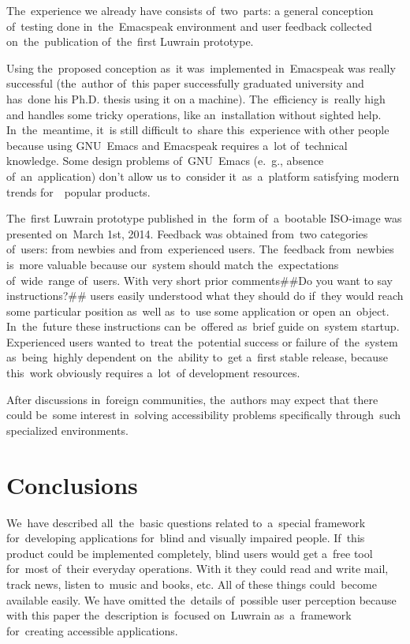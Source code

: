 \documentclass{acm_proc_article-sp}
\begin{document}
The~experience we already have consists of~two~parts: 
a general conception of~testing done in~the~Emacspeak environment 
and user feedback collected on~the~publication of~the~first Luwrain prototype.

Using the~proposed conception as~it was~implemented in~Emacspeak was really successful 
(the~author of~this paper successfully graduated university and has~done his Ph.D. thesis using it on a machine).
The~efficiency is~really high and handles some tricky operations,
like an~installation without sighted help.
In~the~meantime, it~is still difficult to~share this~experience with other people 
because using GNU~Emacs and Emacspeak requires a~lot of~technical knowledge.
Some design problems of~GNU~Emacs (e.~g., absence of~an~application)
don't allow us to~consider it~as~a~platform satisfying modern trends for~~popular products.

The~first Luwrain prototype published in~the~form of~a~bootable ISO-image 
was presented on~March 1st, 2014.
Feedback was obtained from~two categories of~users: from newbies and from~experienced users.
The~feedback from~newbies is~more valuable because our~system should
match the~expectations of~wide~range of~users.
With very short prior comments##Do you want to say instructions?## users easily understood what they should do if~they would reach some particular position 
as~well as~to~use some application or open an~object.
In~the~future these instructions can be~offered as~brief guide on~system startup.
Experienced users wanted to~treat the~potential success or failure of~the~system 
as~being~highly dependent on~the~ability to~get a~first stable release,
because this~work obviously requires a~lot~of development resources.

After discussions in~foreign communities, 
the~authors may expect that there could be~some interest 
in~solving accessibility problems specifically through~such specialized environments.

\section{Conclusions}

We~have described all~the~basic questions related 
to~a~special framework for~developing applications for~blind and visually impaired people.
If~this product could be implemented completely,
blind users would get a~free tool for~most of~their everyday operations.
With it they could read and write mail, track news, 
listen to~music and books, etc.
All of these things could~become available easily.
We have omitted the~details of~possible user perception 
because with this paper the~description is~focused on~Luwrain as~a~framework for~creating accessible applications.
\end{document}
